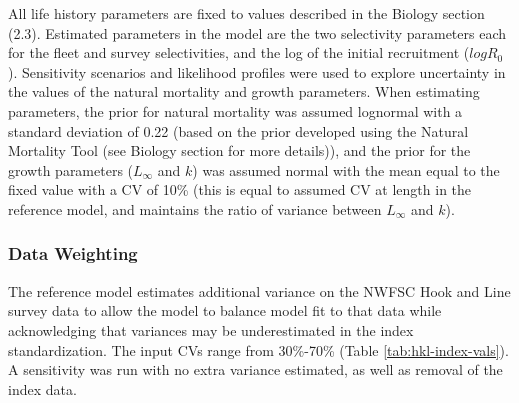 \documentclass[11pt,
  english,
  a4paper,
]{article}
\begin{document}
\leavevmode\tagmcend\tagstructend


All life history parameters are fixed to values described in the Biology section (2.3). Estimated parameters in the model are the two selectivity parameters each for the fleet and survey selectivities, and the log of the initial recruitment ({\(logR_0\)\leavevmode\tagmcend\tagstructend}). Sensitivity scenarios and likelihood profiles were used to explore uncertainty in the values of the natural mortality and growth parameters. When estimating parameters, the prior for natural mortality was assumed lognormal with a standard deviation of 0.22 (based on the prior developed using the Natural Mortality Tool (see Biology section for more details)), and the prior for the growth parameters ({\(L_{\infty}\)\leavevmode\tagmcend\tagstructend} and {\(k\)\leavevmode\tagmcend\tagstructend}) was assumed normal with the mean equal to the fixed value with a CV of 10\% (this is equal to assumed CV at length in the reference model, and maintains the ratio of variance between {\(L_{\infty}\)\leavevmode\tagmcend\tagstructend} and {\(k\)\leavevmode\tagmcend\tagstructend}).

\leavevmode\tagmcend\tagstructend\par


\hypertarget{data-weighting}{%
\subsubsection{Data Weighting}\label{data-weighting}}

\leavevmode\tagmcend\tagstructend


The reference model estimates additional variance on the NWFSC Hook and Line survey data to allow the model to balance model fit to that data while acknowledging that variances may be underestimated in the index standardization. The input CVs range from 30\%-70\% (Table \ref{tab:hkl-index-vals}). A sensitivity was run with no extra variance estimated, as well as removal of the index data.
\end{document}
